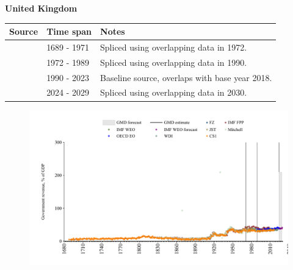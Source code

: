 \documentclass[12pt,a4paper,landscape]{article}
\begin{document}
\begin{adjustbox}{max totalsize={\paperwidth}{\paperheight},center}
\begin{minipage}[t][\textheight][t]{\textwidth}
\vspace*{0.5cm}
{}
\begin{center}
{\Large\bfseries United Kingdom}
\end{center}
\vspace{0.5cm}
\begin{table}[H]
\centering
\small
\begin{tabular}{|l|l|l|}
\hline
\textbf{Source} & \textbf{Time span} & \textbf{Notes} \\
\hline
\rowcolor{white}\cite{CS1_GBR}& 1689 - 1971 &Spliced using overlapping data in 1972.\\
\rowcolor{lightgray}\cite{WDI}& 1972 - 1989 &Spliced using overlapping data in 1990.\\
\rowcolor{white}\cite{OECD_EO}& 1990 - 2023 &Baseline source, overlaps with base year 2018.\\
\rowcolor{lightgray}\cite{IMF_WEO_forecast}& 2024 - 2029 &Spliced using overlapping data in 2030.\\
\hline
\end{tabular}
\end{table}
\begin{figure}[H]
\centering
\includegraphics[width=\textwidth,height=0.6\textheight,keepaspectratio]{graphs/GBR_govrev_GDP.pdf}
\end{figure}
\end{minipage}
\end{adjustbox}
\end{document}
